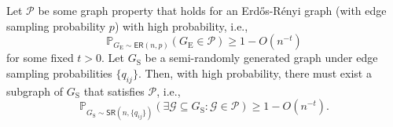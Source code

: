 \documentclass[sigconf,nonacm,pbalance]{acmart}
\begin{document}
\begin{lemma}\label{lem:recovering-properties-of-erdos-renyi-graphs}
Let $\mathcal{P}$ be some graph property that holds for an Erd\H{o}s-R\'{e}nyi graph (with edge sampling probability $p$) with high probability, i.e., 
\begin{equation}
\mathbb{P}_{G_\text{E} \sim \mathsf{ER}(n,p)}(G_\text{E} \in \mathcal{P}) \geq 1 - O(n^{-t})
\end{equation}
for some fixed $t>0$.
Let $G_\text{S}$ be a semi-randomly generated graph under edge sampling probabilities $\{q_{ij}\}$. Then, with high probability, there must exist a subgraph of $G_\text{S}$ that satisfies $\mathcal{P}$, i.e.,
\begin{equation}
\mathbb{P}_{G_\text{S} \sim \mathsf{SR}(n,\{q_{ij}\})}(\exists \mathcal{G} \subseteq G_\text{S}: \mathcal{G} \in \mathcal{P}) \geq 1 - O(n^{-t}).
\end{equation}
\end{lemma}
\end{document}
